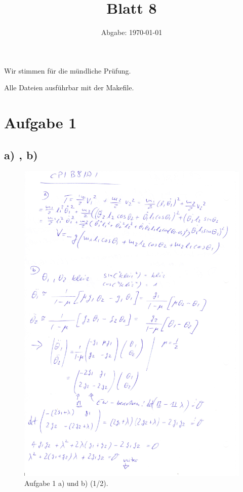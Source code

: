 

\usepackage{listings}
\usepackage[dvipsnames]{xcolor}

\title{Blatt 8}
\date{
  Abgabe: \today
}


\maketitle
Wir stimmen für die mündliche Prüfung.

Alle Dateien ausführbar mit der Makefile. %
\section*{Aufgabe 1}
\subsection*{a) , b)}
\begin{figure}
  \includegraphics[width=\textwidth]{cp_8_11.jpg}
  \caption{Aufgabe 1 a) und b) (1/2).}
  \label{fig:bild1}
\end{figure}


